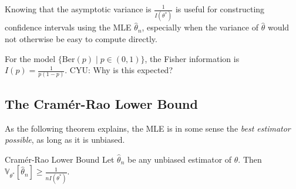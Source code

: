 Knowing that the asymptotic variance is $\frac{1}{I(\theta^*)}$
is useful for constructing confidence intervals using the MLE $\hat{\theta}_n$,
especially when the variance of $\hat{\theta}$ would not otherwise be easy to compute directly.

\begin{remark}
    For the model $\{\mathrm{Ber}(p) \mid p \in (0, 1)\}$,
    the Fisher information is $I(p) = \frac{1}{p(1 - p)}$.
    CYU: Why is this expected?
\end{remark}

\subsection{The Cramér-Rao Lower Bound}

As the following theorem explains,
the MLE is in some sense the \emph{best estimator possible},
as long as it is unbiased.

\begin{theorem}{Cramér-Rao Lower Bound}
    Let $\hat{\theta}_n$ be any unbiased estimator of $\theta$.
    Then $\mathbb{V}_{\theta^*}[\hat{\theta}_n] \geq \frac{1}{nI(\theta^*)}$.
\end{theorem}

